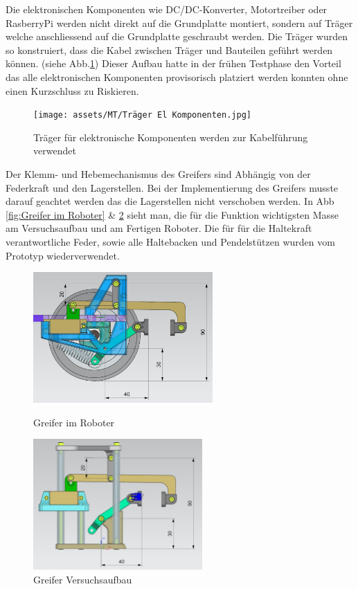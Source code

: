 Die elektronischen Komponenten wie DC/DC-Konverter, Motortreiber oder RasberryPi werden nicht direkt auf die Grundplatte montiert, sondern auf Träger welche anschliessend auf die Grundplatte geschraubt werden. Die Träger wurden so konstruiert, dass die Kabel zwischen Träger und Bauteilen geführt werden können. (siehe Abb.\ref{fig: Träger für elektronische Komponenten}) Dieser Aufbau hatte in der frühen Testphase den Vorteil das alle elektronischen Komponenten provisorisch platziert werden konnten ohne einen Kurzschluss zu Riskieren. 

\begin{figure}[H]
\centering
\texttt{[image: assets/MT/Träger El Komponenten.jpg]}
\caption{Träger für elektronische Komponenten werden zur Kabelführung verwendet}
\label{fig: Träger für elektronische Komponenten}
\end{figure}


Der Klemm- und Hebemechanismus des Greifers sind Abhängig von der Federkraft und den Lagerstellen. Bei der Implementierung des Greifers musste darauf geachtet werden das die Lagerstellen nicht verschoben werden. In Abb \ref{fig:Greifer im Roboter} \& \ref{fig:Greifer Versuchsaufbau} sieht man, die für die Funktion wichtigsten Masse am Versuchsaufbau und am Fertigen Roboter. Die für für die Haltekraft verantwortliche Feder, sowie alle Haltebacken und Pendelstützen wurden vom Prototyp wiederverwendet. 

\begin{figure}[H]
  \centering
  \begin{minipage}[b]{0.45\textwidth}
    \centering
    \includegraphics[height=5cm]{assets/MT/Greifer Montiert.png}
    \caption{Greifer im Roboter}
    \label{fig:Greifer im Roboter}
  \end{minipage}
  \hfill
  \begin{minipage}[b]{0.45\textwidth}
    \centering
    \includegraphics[height=5cm]{assets/MT/Greifer Prototyp.png}
    \caption{Greifer Versuchsaufbau}
    \label{fig:Greifer Versuchsaufbau}
  \end{minipage}
\end{figure}

